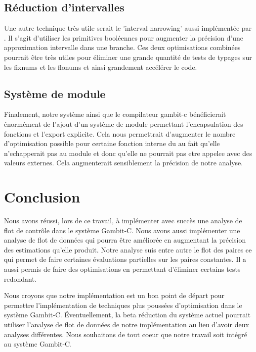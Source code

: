 \subsection{Réduction d'intervalles}

Une autre technique très utile serait le 'interval narrowing' aussi
implémentée par \cite{boucher2000}.  Il s'agit d'utiliser les
primitives booléennes pour augmenter la précision d'une approximation
intervalle dans une branche. Ces deux optimisations combinées pourrait
être très utiles pour éliminer une grande quantité de tests de
typages sur les fixnums et les flonums et ainsi grandement accélérer
le code.

\subsection{Système de module}

Finalement, notre système ainsi que le compilateur gambit-c
bénéficierait énormément de l'ajout d'un système de module permettant
l'encapsulation des fonctions et l'export explicite. Cela nous
permettrait d'augmenter le nombre d'optimisation possible pour
certaine fonction interne du au fait qu'elle n'echapperait pas au
module et donc qu'elle ne pourrait pas etre appelee avec des valeurs
externes. Cela augmenterait sensiblement la précision de notre
analyse.

\clearpage

\section{Conclusion}

Nous avons réussi, lors de ce travail, à implémenter avec succès une
analyse de flot de contrôle dans le système Gambit-C. Nous avons aussi
implémenter une analyse de flot de données qui pourra être améliorée
en augmentant la précision des estimations qu'elle produit. Notre
analyse suis entre autre le flot des paires ce qui permet de faire
certaines évaluations partielles sur les paires constantes. Il a aussi
permis de faire des optimisations en permettant d'éliminer certains
tests redondant.

Nous croyons que notre implémentation est un bon point de départ pour
permettre l'implémentation de techniques plus poussées d'optimisation
dans le système Gambit-C. Éventuellement, la beta réduction du système
actuel pourrait utiliser l'analyse de flot de données de notre
implémentation au lieu d'avoir deux analyses différentes. Nous
souhaitons de tout coeur que notre travail soit intégré au système
Gambit-C.
